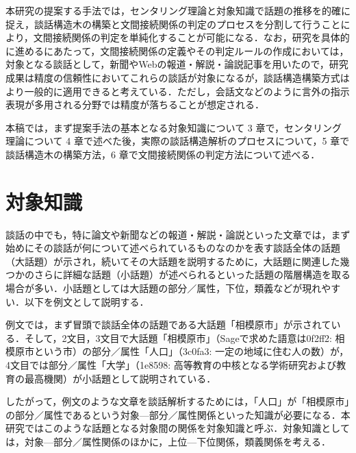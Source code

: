 \documentclass[japanese]{jnlp_1.4}
\begin{document}
本研究の提案する手法では，センタリング理論と対象知識で話題の推移を的確に捉え，談話構造木の構築と文間接続関係の判定のプロセスを分割して行うことにより，文間接続関係の判定を単純化することが可能になる．なお，研究を具体的に進めるにあたって，文間接続関係の定義やその判定ルールの作成においては，対象となる談話として，新聞やWebの報道・解説・論説記事を用いたので，研究成果は精度の信頼性においてこれらの談話が対象になるが，談話構造構築方式はより一般的に適用できると考えている．ただし，会話文などのように言外の指示表現が多用される分野では精度が落ちることが想定される．

本稿では，まず提案手法の基本となる対象知識について 3 章で，センタリング理論について 4 章で述べた後，実際の談話構造解析のプロセスについて，5 章で談話構造木の構築方法，6 章で文間接続関係の判定方法について述べる．



\section{対象知識}
\label{sec:mylabel3}

談話の中でも，特に論文や新聞などの報道・解説・論説といった文章では，まず始めにその談話が何について述べられているものなのかを表す談話全体の話題（大話題）が示され，続いてその大話題を説明するために，大話題に関連した幾つかのさらに詳細な話題（小話題）が述べられるといった話題の階層構造を取る場合が多い．小話題としては大話題の部分／属性，下位，類義などが現れやすい．以下を例文として説明する．

\vspace{0.5\baselineskip}
\vspace{0.5\baselineskip}

例文では，まず冒頭で談話全体の話題である大話題「相模原市」が示されている．そして，2文目，3文目で大話題「相模原市」（Sageで求めた語意は0f2ff2: 相模原市という市）の部分／属性「人口」（3c0fa3: 一定の地域に住む人の数）が，4文目では部分／属性「大学」（1e8598: 高等教育の中核となる学術研究および教育の最高機関）が小話題として説明されている．

したがって，例文のような文章を談話解析するためには，「人口」が「相模原市」の部分／属性であるという対象—部分／属性関係といった知識が必要になる．本研究ではこのような話題となる対象間の関係を対象知識と呼ぶ．対象知識としては，対象—部分／属性関係のほかに，上位—下位関係，類義関係を考える．
\end{document}
